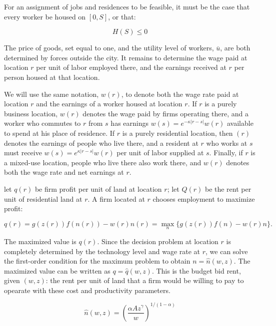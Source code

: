 For an assignment of jobs and residences to be feasible, it must be the case that every worker be housed on $[0, S]$, or that:

\begin{equation}
    H(S) \leq 0
\end{equation}

The price of goods, set equal to one, and the utility level of workers, $\overline{u}$, are both determined by forces outside the city. It remains to determine the wage paid at location $r$ per unit of labor employed there, and the earnings received at $r$ per person housed at that location.

We will use the same notation, $w(r)$, to denote both the wage rate paid at location $r$ and the earnings of a worker housed at location $r$. If $r$ is a purely business location, $w(r)$ denotes the wage paid by firms operating there, and a worker who commutes to $r$ from $s$ has earnings $w(s) = e^{-\kappa |r - s|}w(r)$ available to spend at his place of residence. If $r$ is a purely residential location, then $(r)$ denotes the earnings of people who live there, and a resident at $r$ who works at $s$ must receive $w(s) = e^{\kappa |r - s|}w(r)$ per unit of labor supplied at $s$. Finally, if $r$ is a mixed-use location, people who live there also work there, and $w(r)$ denotes both the wage rate and net earnings at $r$.

let $q(r)$ be firm profit per unit of land at location $r$; let $Q(r)$ be the rent per unit of residential land at $r$. A firm located at $r$ chooses employment to maximize profit:

\begin{equation}
    q(r) = g(z(r))f(n(r)) - w(r)n(r) = \max_n \{g(z(r))f(n) - w(r)n\}.
\end{equation}

The maximized value is $q(r)$. Since the decision problem at location $r$ is completely determined by the technology level and wage rate at $r$, we can solve the first-order condition for the maximum problem to obtain $n = \hat{n}(w, z)$. The maximized value can be written as $q = \hat{q}(w, z)$. This is the budget bid rent, given $(w, z)$: the rent per unit of land that a firm would be willing to pay to opearate with these cost and productivity parameters.

\begin{equation*}
    \hat{n}(w, z) = (\frac{\alpha A z^{\gamma}}{w})^{1/(1 - \alpha)}
\end{equation*}

